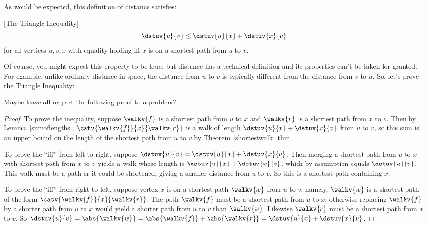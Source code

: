 As would be expected, this definition of distance satisfies:
\begin{lemma}\label{lem:tri-ineq} [The Triangle Inequality]
\[
\dstuv{u}{v} \leq \dstuv{u}{x} + \dstuv{x}{v}
\]
for all vertices $u,v,x$ with equality holding iff $x$ is on a shortest
path from $u$ to $v$.
\end{lemma}
Of course, you might expect this property to be true, but distance has a
technical definition and its properties can't be taken for granted.
For example, unlike ordinary distance in space, the distance from $u$
to $v$ is typically different from the distance from $v$ to $u$.
So, let's prove the Triangle Inequality:

\begin{editingnotes}
  Maybe leave all or part the following proof to a problem?
\end{editingnotes}

\begin{proof}
  To prove the inequality, suppose $\walkv{f}$ is a shortest path from
  $u$ to $x$ and $\walkv{r}$ is a shortest path from $x$ to $v$.  Then
  by Lemma~\ref{sumoflengths}, $\catv{\walkv{f}}{x}{\walkv{r}}$ is a
  walk of length $\dstuv{u}{x} + \dstuv{x}{v}$ from $u$ to $v$, so
  this sum is an upper bound on the length of the shortest path from
  $u$ to $v$ by Theorem~\ref{shortestwalk_thm}.

  To prove the ``iff'' from left to right, suppose $\dstuv{u}{v} =
  \dstuv{u}{x} + \dstuv{x}{v}$.  Then merging a shortest path from $u$
  to $x$ with shortest path from $x$ to $v$ yields a walk whose length
  is $\dstuv{u}{x} + \dstuv{x}{v}$, which by assumption equals
  $\dstuv{u}{v}$.  This walk must be a path or it could be shortened,
  giving a smaller distance from $u$ to $v$.  So this is a shortest
  path containing $x$.

  To prove the ``iff'' from right to left, suppose vertex $x$ is on a
  shortest path $\walkv{w}$ from $u$ to $v$, namely, $\walkv{w}$ is a
  shortest path of the form $\catv{\walkv{f}}{x}{\walkv{r}}$.  The
  path $\walkv{f}$ must be a shortest path from $u$ to $x$; otherwise
  replacing $\walkv{f}$ by a shorter path from $u$ to $x$ would yield
  a shorter path from $u$ to $v$ than $\walkv{w}$.  Likewise
  $\walkv{r}$ must be a shortest path from $x$ to $v$.  So
  $\dstuv{u}{v} = \abs{\walkv{w}} = \abs{\walkv{f}} + \abs{\walkv{r}}
  = \dstuv{u}{x} + \dstuv{x}{v}$.
  
\end{proof}

